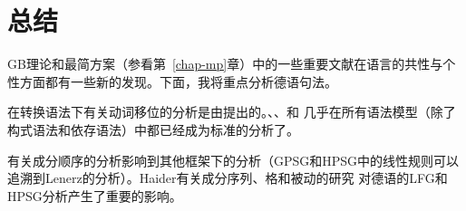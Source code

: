 \section{总结}
\label{sec-summary-gb}

GB理论和最简方案（参看第~\ref{chap-mp}章）中的一些重要文献在语言的共性与个性方面都有一些新的发现。下面，我将重点分析德语句法。

在转换语法下有关动词移位的分析是由\citet*[]{Bierwisch63}提出的。\citet{Reis74a}、\citet{Koster75a}、\citet[Chapter~1]{Thiersch78a}和 \citet{denBesten83a}几乎在所有语法模型（除了构式语法\indexcxg 和依存语法\indexdg ）中都已经成为标准的分析了。

\citet{Lenerz77}有关成分顺序的分析影响到其他框架下的分析（GPSG和HPSG中的线性规则可以追溯到Lenerz的分析）。Hai\-der有关成分序列、格和被动的研究\citeyearpar{Haider84b,Haider85,Haider85b,Haider86,Haider90a,Haider93a} 对德语的LFG和HPSG分析产生了重要的影响。

